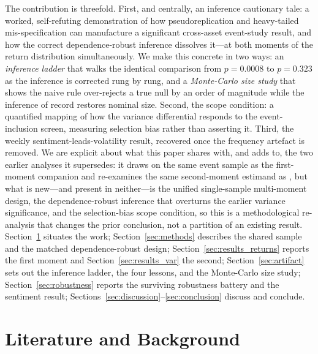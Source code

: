 \documentclass[pdflatex,sn-mathphys-num]{sn-jnl}
\theoremstyle{thmstyleone}
\theoremstyle{thmstyletwo}
\theoremstyle{thmstylethree}
\begin{document}
The contribution is threefold. First, and centrally, an inference cautionary tale: a worked, self-refuting demonstration of how pseudoreplication and heavy-tailed mis-specification can manufacture a significant cross-asset event-study result, and how the correct dependence-robust inference dissolves it---at both moments of the return distribution simultaneously. We make this concrete in two ways: an \emph{inference ladder} that walks the identical comparison from $p=0.0008$ to $p=0.323$ as the inference is corrected rung by rung, and a \emph{Monte-Carlo size study} that shows the naive rule over-rejects a true null by an order of magnitude while the inference of record restores nominal size. Second, the scope condition: a quantified mapping of how the variance differential responds to the event-inclusion screen, measuring selection bias rather than asserting it. Third, the weekly sentiment-leads-volatility result, recovered once the frequency artefact is removed. We are explicit about what this paper shares with, and adds to, the two earlier analyses it supersedes: it draws on the same event sample as the first-moment companion \citep{Farzulla2025SameReturns} and re-examines the same second-moment estimand as \citep{Farzulla2025Infra}, but what is new---and present in neither---is the unified single-sample multi-moment design, the dependence-robust inference that overturns the earlier variance significance, and the selection-bias scope condition, so this is a methodological re-analysis that changes the prior conclusion, not a partition of an existing result. Section~\ref{sec:literature} situates the work; Section~\ref{sec:methods} describes the shared sample and the matched dependence-robust design; Section~\ref{sec:results_returns} reports the first moment and Section~\ref{sec:results_var} the second; Section~\ref{sec:artifact} sets out the inference ladder, the four lessons, and the Monte-Carlo size study; Section~\ref{sec:robustness} reports the surviving robustness battery and the sentiment result; Sections~\ref{sec:discussion}--\ref{sec:conclusion} discuss and conclude.


\section{Literature and Background}\label{sec:literature}
\end{document}
